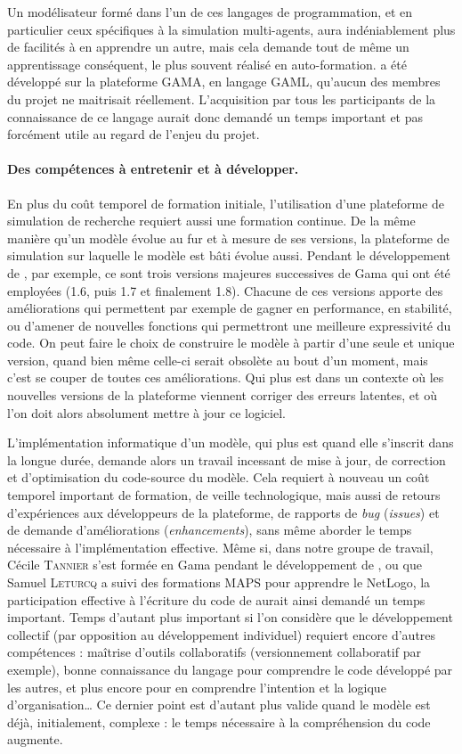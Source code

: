 Un modélisateur formé dans l'un de ces langages de programmation, et en particulier ceux spécifiques à la simulation multi-agents, aura indéniablement plus de facilités à en apprendre un autre, mais cela demande tout de même un apprentissage conséquent, le plus souvent réalisé en auto-formation.
\simfeodal{} a été développé sur la plateforme GAMA, en langage GAML, qu'aucun des membres du projet ne maitrisait réellement.
L'acquisition par tous les participants de la connaissance de ce langage aurait donc demandé un temps important et pas forcément utile au regard de l'enjeu du projet.

\paragraph{Des compétences à entretenir et à développer.}
En plus du coût temporel de formation initiale, l'utilisation d'une plateforme de simulation \og de recherche\fg{} requiert aussi une formation continue.
De la même manière qu'un modèle évolue au fur et à mesure de ses versions, la plateforme de simulation sur laquelle le modèle est bâti évolue aussi.
Pendant le développement de \simfeodal{}, par exemple, ce sont trois versions \og majeures\fg{} successives de Gama qui ont été employées (1.6, puis 1.7 et finalement 1.8).
Chacune de ces versions apporte des améliorations qui permettent par exemple de gagner en performance, en stabilité, ou d'amener de nouvelles fonctions qui permettront une meilleure expressivité du code.
On peut faire le choix de construire le modèle à partir d'une seule et unique version, quand bien même celle-ci serait obsolète au bout d'un moment, mais c'est se couper de toutes ces améliorations.
Qui plus est dans un contexte où les nouvelles versions de la plateforme viennent corriger des erreurs latentes, et où l'on doit alors absolument mettre à jour ce logiciel.

L'implémentation informatique d'un modèle, qui plus est quand elle s'inscrit dans la longue durée, demande alors un travail incessant de mise à jour, de correction et d'optimisation du code-source du modèle.
Cela requiert à nouveau un coût temporel important de formation, de veille technologique, mais aussi de retours d'expériences aux développeurs de la plateforme, de rapports de \textit{bug} (\textit{issues}) et de demande d'améliorations (\textit{enhancements}), sans même aborder le temps nécessaire à l'implémentation effective.
Même si, dans notre groupe de travail, Cécile \textsc{Tannier} s'est formée en Gama pendant le développement de \simfeodal{}, ou que Samuel \textsc{Leturcq} a suivi des formations MAPS pour apprendre le NetLogo, la participation effective à l'écriture du code de \simfeodal{} aurait ainsi demandé un temps important.
Temps d'autant plus important si l'on considère que le développement collectif (par opposition au développement individuel) requiert encore d'autres compétences :
	maîtrise d'outils collaboratifs (versionnement collaboratif par exemple), bonne connaissance du langage pour comprendre le code développé par les autres, et plus encore pour en comprendre l'intention et la logique d'organisation\ldots
Ce dernier point est d'autant plus valide quand le modèle est déjà, initialement, complexe : le temps nécessaire à la compréhension du code augmente.

